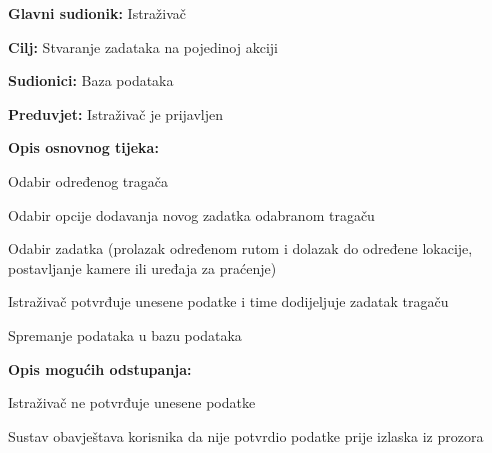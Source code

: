 					\noindent {}
					\begin{packed_item}
						
						\item \textbf{Glavni sudionik: }Istraživač
						\item  \textbf{Cilj:} Stvaranje zadataka na pojedinoj akciji
						\item  \textbf{Sudionici:} Baza podataka
						\item  \textbf{Preduvjet:} Istraživač je prijavljen
						\item  \textbf{Opis osnovnog tijeka:}
						
						\item[] \begin{packed_enum}
							
							\item Odabir određenog tragača
							\item Odabir opcije dodavanja novog zadatka odabranom tragaču
							\item Odabir zadatka (prolazak određenom rutom i dolazak do određene lokacije, postavljanje
							kamere ili uređaja za praćenje)
							\item Istraživač potvrđuje unesene podatke i time dodijeljuje zadatak tragaču
							\item Spremanje podataka u bazu podataka
						\end{packed_enum}
						
						\item  \textbf{Opis mogućih odstupanja:}
						
						\item[] \begin{packed_item}
							
							
							\item[4.a] Istraživač ne potvrđuje unesene podatke
							\item[] \begin{packed_enum}
								
								\item Sustav obavještava korisnika da nije potvrdio podatke prije izlaska iz prozora
								
								\end{packed_enum}
							
						\end{packed_item}
						
					\end{packed_item}
					
